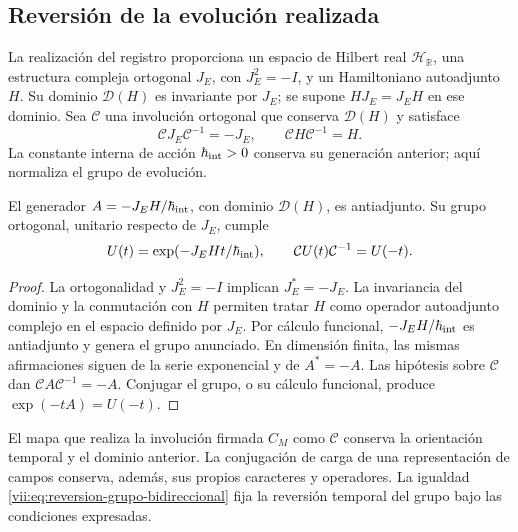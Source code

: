 \subsection{Reversión de la evolución realizada}
\label{vii:subsec:reversion-evolucion}

La realización del registro proporciona un espacio de Hilbert real
\(\mathcal H_{\mathbb R}\), una estructura compleja ortogonal
\(J_E\), con \(J_E^2=-I\), y un Hamiltoniano autoadjunto \(H\).
Su dominio \(\mathcal D(H)\) es invariante por \(J_E\); se supone
\(HJ_E=J_EH\) en ese dominio. Sea \(\mathcal C\) una involución
ortogonal que conserva \(\mathcal D(H)\) y satisface
\begin{equation}
 \mathcal C J_E\mathcal C^{-1}=-J_E,\qquad
 \mathcal C H\mathcal C^{-1}=H.
 \label{vii:eq:dominio-reversion-evolucion}
\end{equation}
La constante interna de acción \(\hbar_{\rm int}>0\) conserva su
generación anterior; aquí normaliza el grupo de evolución.

\begin{theorem}
\label{vii:thm:reversion-evolucion}
El generador \(A=-J_EH/\hbar_{\rm int}\), con dominio \(\mathcal D(H)\),
es antiadjunto. Su grupo ortogonal, unitario respecto de \(J_E\), cumple
\begin{equation}
 U(t)=\exp(-J_EHt/\hbar_{\rm int}),\qquad
 \mathcal C U(t)\mathcal C^{-1}=U(-t).
 \label{vii:eq:reversion-grupo-bidireccional}
\end{equation}
\end{theorem}
\begin{proof}
La ortogonalidad y \(J_E^2=-I\) implican \(J_E^*=-J_E\).
La invariancia del dominio y la conmutación con \(H\) permiten tratar
\(H\) como operador autoadjunto complejo en el espacio definido por
\(J_E\). Por cálculo funcional, \(-J_EH/\hbar_{\rm int}\) es
antiadjunto y genera el grupo anunciado. En dimensión finita, las mismas
afirmaciones siguen de la serie exponencial y de \(A^*=-A\).
Las hipótesis sobre \(\mathcal C\) dan
\(\mathcal C A\mathcal C^{-1}=-A\). Conjugar el grupo, o su cálculo
funcional, produce \(\exp(-tA)=U(-t)\).
\end{proof}

El mapa que realiza la involución firmada \(C_M\) como \(\mathcal C\)
conserva la orientación temporal y el dominio anterior. La conjugación de
carga de una representación de campos conserva, además, sus propios
caracteres y operadores. La igualdad
\eqref{vii:eq:reversion-grupo-bidireccional} fija la reversión temporal
del grupo bajo las condiciones expresadas.

